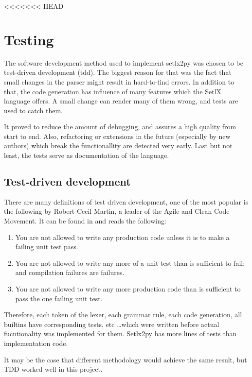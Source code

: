<<<<<<< HEAD
\section{Testing}

The software development method used to implement setlx2py was chosen to be test-driven development (\gls{tdd}). The biggest reason for that was the fact that small changes in the parser might result in hard-to-find errors. In addition to that, the code generation has influence of many features which the SetlX language offers. A small change can render many of them wrong, and tests are used to catch them.

It proved to reduce the amount of debugging, and assures a high quality from start to end. Also, refactoring or extensions in the future (especially by new authors) which break the functionallity are detected very early. Last but not least, the tests serve as documentation of the language.

\subsection{Test-driven development}

There are many definitions of test driven development, one of the most popular is the following by Robert Cecil Martin, a leader of the Agile and Clean Code Movement. It can be found in \cite{tdd} and reads the following:

\begin{enumerate}
\item You are not allowed to write any production code unless it is to make a failing unit test pass.
\item You are not allowed to write any more of a unit test than is sufficient to fail; and compilation failures are failures.
\item You are not allowed to write any more production code than is sufficient to pass the one failing unit test.
\end{enumerate}

Therefore, each token of the lexer, each grammar rule, each code generation, all builtins have corresponding tests, etc \ldots which were written before actual fucntionality was implemented for them. Setlx2py has more lines of tests than implementation code.

It may be the case that different methodology would achieve the same result, but TDD worked well in this project.

